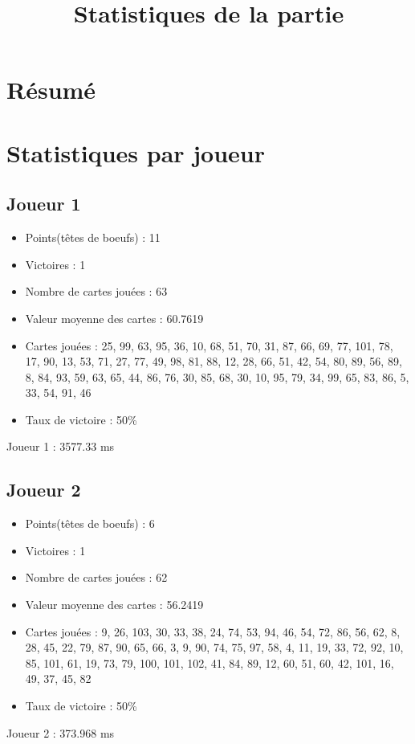 \documentclass{article}
\title{Statistiques de la partie}
\date{}
\begin{document}
\maketitle
\section*{Résumé}
\section*{Statistiques par joueur}
\subsection*{Joueur 1}
\begin{itemize}
\item Points(têtes de boeufs) : 11
\item Victoires : 1
\item Nombre de cartes jouées : 63
\item Valeur moyenne des cartes : 60.7619
\item Cartes jouées : 25, 99, 63, 95, 36, 10, 68, 51, 70, 31, 87, 66, 69, 77, 101, 78, 17, 90, 13, 53, 71, 27, 77, 49, 98, 81, 88, 12, 28, 66, 51, 42, 54, 80, 89, 56, 89, 8, 84, 93, 59, 63, 65, 44, 86, 76, 30, 85, 68, 30, 10, 95, 79, 34, 99, 65, 83, 86, 5, 33, 54, 91, 46
\item Taux de victoire : 50\%
\end{itemize}
Joueur 1 : 3577.33 ms\\
\subsection*{Joueur 2}
\begin{itemize}
\item Points(têtes de boeufs) : 6
\item Victoires : 1
\item Nombre de cartes jouées : 62
\item Valeur moyenne des cartes : 56.2419
\item Cartes jouées : 9, 26, 103, 30, 33, 38, 24, 74, 53, 94, 46, 54, 72, 86, 56, 62, 8, 28, 45, 22, 79, 87, 90, 65, 66, 3, 9, 90, 74, 75, 97, 58, 4, 11, 19, 33, 72, 92, 10, 85, 101, 61, 19, 73, 79, 100, 101, 102, 41, 84, 89, 12, 60, 51, 60, 42, 101, 16, 49, 37, 45, 82
\item Taux de victoire : 50\%
\end{itemize}
Joueur 2 : 373.968 ms\\
\end{document}
